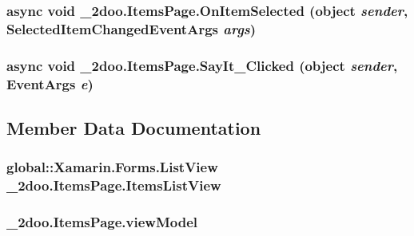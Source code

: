 \hypertarget{class__2doo_1_1_items_page_2a00d5fc1ad2135f8313d4d9aefa74f6}{
\subsubsection[{OnItemSelected}]{\setlength{\rightskip}{0pt plus 5cm}async void \_\-2doo.ItemsPage.OnItemSelected (object {\em sender}, \/  SelectedItemChangedEventArgs {\em args})}}
\label{class__2doo_1_1_items_page_2a00d5fc1ad2135f8313d4d9aefa74f6}


\hypertarget{class__2doo_1_1_items_page_298f1cb4d2e6a6c4b859161a2e599917}{
\subsubsection[{SayIt\_\-Clicked}]{\setlength{\rightskip}{0pt plus 5cm}async void \_\-2doo.ItemsPage.SayIt\_\-Clicked (object {\em sender}, \/  EventArgs {\em e})}}
\label{class__2doo_1_1_items_page_298f1cb4d2e6a6c4b859161a2e599917}




\subsection{Member Data Documentation}
\hypertarget{class__2doo_1_1_items_page_101e20bd06bf5aeed354ea04ad14cb8b}{
\subsubsection[{ItemsListView}]{\setlength{\rightskip}{0pt plus 5cm}global::Xamarin.Forms.ListView {\bf \_\-2doo.ItemsPage.ItemsListView}}}
\label{class__2doo_1_1_items_page_101e20bd06bf5aeed354ea04ad14cb8b}


\hypertarget{class__2doo_1_1_items_page_855bf867d9810ff3f68f6a9f41a71382}{
\subsubsection[{viewModel}]{ {\bf \_\-2doo.ItemsPage.viewModel}}}
\label{class__2doo_1_1_items_page_855bf867d9810ff3f68f6a9f41a71382}




